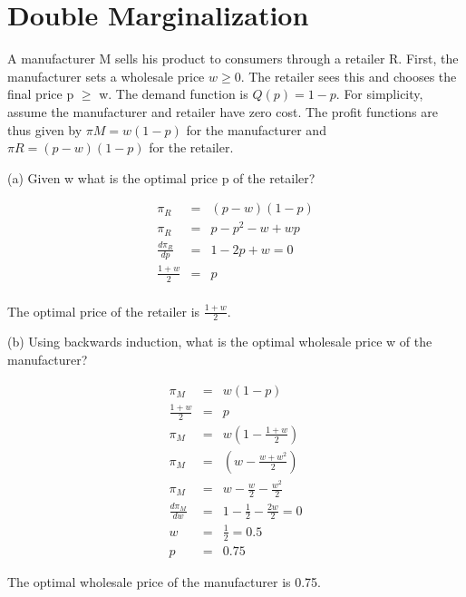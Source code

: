 \section{Double Marginalization}

A manufacturer M sells his product to consumers through a retailer R. First, the manufacturer sets a wholesale price $w \geq 0$. The retailer sees this and chooses the final price p $\geq$ w. The demand function is $Q(p) = 1 - p$. For simplicity, assume the manufacturer and retailer have zero cost. The profit functions are thus given by $\pi M = w(1 - p)$ for the manufacturer and $\pi R = (p - w)(1 - p)$ for the retailer.

\begin{tcolorbox}
    (a) Given w what is the optimal price p of the retailer?
\end{tcolorbox}

\begin{eqnarray*}
\pi_R &=& (p - w)(1 - p)\\
\pi_R &=& p-p^2-w+wp\\
\frac{d\pi_R}{dp} &=& 1-2p+w = 0\\
\frac{1+w}{2} &=& p\\
\end{eqnarray*}

\begin{myanswerbox}
    The optimal price of the retailer is $\frac{1+w}{2}$.
\end{myanswerbox}

\begin{tcolorbox}
    (b) Using backwards induction, what is the optimal wholesale price w of the manufacturer?
\end{tcolorbox}

\begin{eqnarray*}
\pi_M &=& w(1 - p)\\
\frac{1+w}{2} &=& p\\
\pi_M &=& w(1 - \frac{1+w}{2})\\
\pi_M &=& (w - \frac{w+w^2}{2})\\
\pi_M &=& w - \frac{w}{2}-\frac{w^2}{2}\\
\frac{d\pi_M}{dw} &=&  1 - \frac{1}{2}-\frac{2w}{2}=0\\
w&=&\frac{1}{2}=0.5\\
p&=&0.75
\end{eqnarray*}

\begin{myanswerbox}
    The optimal wholesale price of the manufacturer is 0.75.
\end{myanswerbox}

